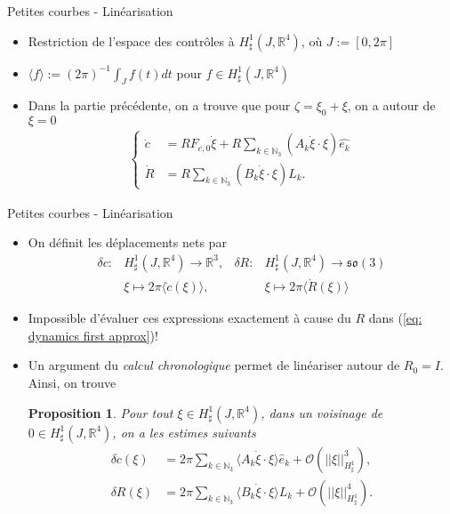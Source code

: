 \documentclass[10pt, envcountsect]{beamer}
\theoremstyle{plain}
\newtheorem{proposition}{Proposition}[section]
\newcommand{\N}{\mathbb{N}}
\newcommand{\R}{\mathbb{R}}
\newcommand{\so}{\mathfrak{so}}
\begin{document}
\begin{frame}{Petites courbes - Linéarisation}
\begin{itemize}
\item Restriction de l'espace des contrôles à $H^1_{\sharp}(J, \R^4)$, où $J := [0, 2\pi]$
\item $\langle f \rangle := (2 \pi)^{-1 }\int_{J} f(t) d t$ pour $f \in H^1_{\sharp}(J, \R^4)$

\item Dans la partie précédente, on a trouve que pour $\zeta = \xi_0 + \xi$, on a autour de $\xi = 0$
 \begin{align}
 \label{eq: dynamics first approx}
 \begin{cases}
 	\dot{c} &= R F_{c,0} \dot{\xi} + R \sum_{k \in \N_3}(A_k \dot{\xi} \cdot \xi)\hat{e_k}\\
 	\dot{R} &= R \sum_{k \in \N_3} (B_k \dot{\xi} \cdot \xi) L_k.
 \end{cases}
 \end{align}
\end{itemize}

\end{frame}

\begin{frame}{Petites courbes - Linéarisation}
\begin{itemize}
\item On définit les déplacements nets par
\begin{align}
	\delta c: &H_{\sharp}^1(J,\R^4) \to \R^3, &
	\delta R: & H_{\sharp}^1(J,\R^4) \to \so(3)\\
	&\xi \mapsto 2\pi \langle \dot{c} (\xi) \rangle \nonumber, &
	&\xi \mapsto 2 \pi \langle \dot{R}(\xi) \rangle \nonumber
\end{align}
\item Impossible d'évaluer ces expressions exactement à cause du $R$ dans (\ref{eq: dynamics first approx})!

\item Un argument du \emph{calcul chronologique} permet de linéariser autour de $R_0 = I$. Ainsi, on trouve

\begin{proposition}
\label{prop:net displacement}
Pour tout $\xi \in H_\sharp^1(J, \R^4)$, dans un voisinage de $0 \in H_{\sharp}^{1}(J, \R^4)$, on a les estimes suivants
\begin{equation}
\begin{aligned}
\delta c(\xi) &= 2 \pi \sum_{k \in \N_3} \langle A_k \dot{\xi} \cdot \xi \rangle \hat{e}_k + \mathcal{O}(||\xi||_{H^1_{\sharp}}^3),\\
\delta R(\xi) &= 2 \pi \sum_{k \in \N_3} \langle B_k \dot{\xi} \cdot \xi \rangle L_k + \mathcal{O}(||\xi||^4_{H_\sharp^1}).
\end{aligned}
\end{equation}
\end{proposition}
\end{itemize}

\end{frame}
\end{document}
